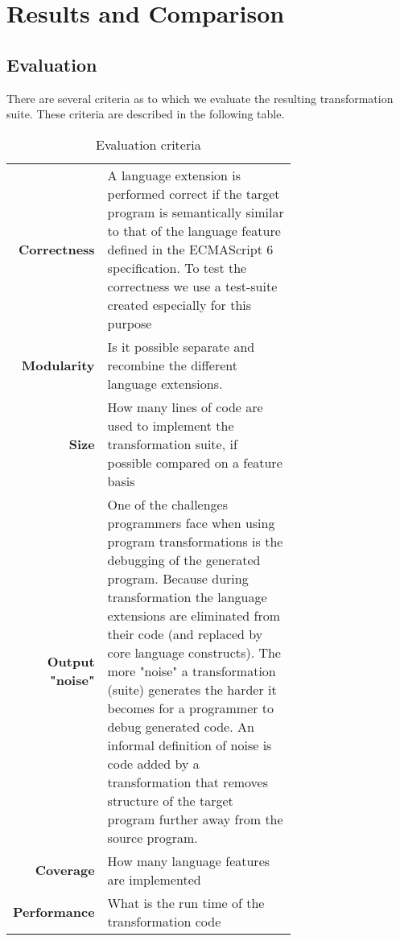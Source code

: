 
\chapter{Results and Comparison} %

\label{Chapter4}


\section{Evaluation}

There are several criteria as to which we evaluate the resulting transformation suite. These criteria are described in the following table.

\begin{table}[h]
\def\arraystretch{1.5}
\caption{Evaluation criteria}
\label{criteria}
\begin{tabular}{rp{0.7\linewidth}}
{\bf Correctness} & A language extension is performed correct if the target program is semantically similar to that of the language feature defined in the ECMAScript 6 specification\cite{SpecJS}. To test the correctness we use a test-suite created especially for this purpose\footnotemark\\
{\bf Modularity}  & Is it possible separate and recombine the different language extensions.\\
{\bf Size}        & How many lines of code are used to implement the transformation suite, if possible compared on a feature basis\\
{\bf Output "noise"} & One of the challenges programmers face when using program transformations is the debugging of the generated program. Because during transformation the language extensions are eliminated from their code (and replaced by core language constructs). The more "noise" a transformation (suite) generates the harder it becomes for a programmer to debug generated code. An informal definition of noise is code added by a transformation that removes structure of the target program further away from the source program. \\
{\bf Coverage}    & How many language features are implemented\\
{\bf Performance} & What is the run time of the transformation code\\
\end{tabular}
\end{table}

